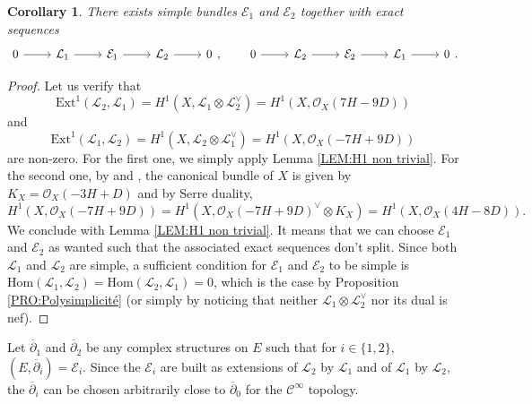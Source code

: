\documentclass{article}
\newtheorem{corollary}[theorem]{Corollary}
\theoremstyle{remark}
\theoremstyle{definition}
\newcommand{\Hom}{\mathrm{Hom}}
\newcommand{\OX}{\mathcal{O}}
\newcommand{\E}{\mathcal{E}}
\newcommand{\mC}{\mathcal{C}}
\newcommand{\mL}{\mathcal{L}}
\newcommand{\dbar}{\overline{\partial}}
\begin{document}
\begin{corollary}\label{COR:Existence E1 et E2}
    There exists simple bundles $\E_1$ and $\E_2$ together with exact sequences
    $$
    \begin{tikzcd}
        0 \ar{r} & \mL_1 \ar{r} & \E_1 \ar{r} & \mL_2 \ar{r} & 0
    \end{tikzcd}, \qquad
    \begin{tikzcd}
        0 \ar{r} & \mL_2 \ar{r} & \E_2 \ar{r} & \mL_1 \ar{r} & 0
    \end{tikzcd}.
    $$
\end{corollary}
\begin{proof}
Let us verify that
$$
\mathrm{Ext}^1(\mL_2,\mL_1) = H^1(X,\mL_1 \otimes \mL_2^\lor) = H^1(X,\OX_X(7H - 9D))
$$
and
$$
\mathrm{Ext}^1(\mL_1,\mL_2) = H^1(X,\mL_2 \otimes \mL_1^\lor) = H^1(X,\OX_X(-7H + 9D))
$$
are non-zero. For the first one, we simply apply Lemma \ref{LEM:H1 non trivial}. For the second one, by \cite[Proposition 2.4.3]{Huybrechts} and \cite[Proposition 2.5.5]{Huybrechts}, the canonical bundle of $X$ is given by $K_X = \OX_X(-3H + D)$ and by Serre duality,
$$
H^1(X,\OX_X(-7H + 9D)) = H^1(X,\OX_X(-7H + 9D)^\lor \otimes K_X) = H^1(X,\OX_X(4H - 8D)).
$$
We conclude with Lemma \ref{LEM:H1 non trivial}. It means that we can choose $\E_1$ and $\E_2$ as wanted such that the associated exact sequences don't split. Since both $\mL_1$ and $\mL_2$ are simple, a sufficient condition for $\E_1$ and $\E_2$ to be simple is $\Hom(\mL_1,\mL_2) = \Hom(\mL_2,\mL_1) = 0$, which is the case by Proposition \ref{PRO:Polysimplicité} (or simply by noticing that neither $\mL_1 \otimes \mL_2^\lor$ nor its dual is nef).
\end{proof}

Let $\dbar_1$ and $\dbar_2$ be any complex structures on $E$ such that for $i \in \{1,2\}$, $(E,\dbar_i) = \E_i$. Since the $\E_i$ are built as extensions of $\mL_2$ by $\mL_1$ and of $\mL_1$ by $\mL_2$, the $\dbar_i$ can be chosen arbitrarily close to $\dbar_0$ for the $\mC^\infty$ topology.
\end{document}
